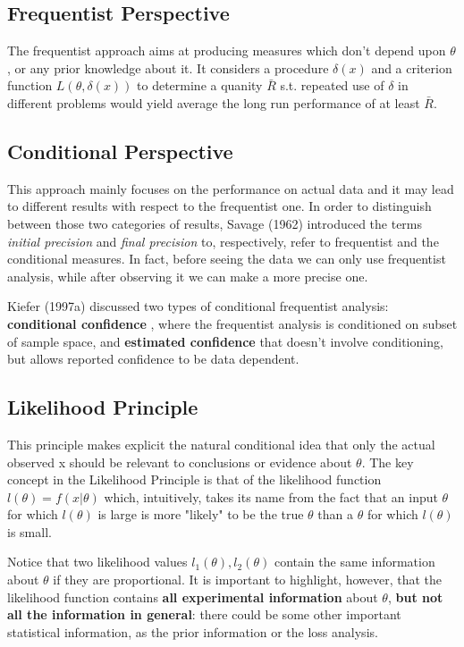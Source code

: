 \documentclass{article}
\begin{document}
	\subsection{Frequentist Perspective}
	The frequentist approach aims at producing measures which don't depend upon $\theta$, or any prior knowledge about it. It considers a procedure $\delta(x)$ and a criterion function $L(\theta, \delta(x))$ to determine a quanity $\bar{R}$ s.t. repeated use of $\delta$ in different problems would yield average the long run performance of at least $\bar{R}$.

	
	\subsection{Conditional Perspective}
	This approach mainly focuses on the performance on actual data and it may lead to different results with respect to the frequentist one. In order to distinguish between
	those two categories of results, Savage (1962) introduced the terms \textit{initial precision} and \textit{final precision} to, respectively, refer to frequentist and the conditional measures. In fact, before seeing the data we can only use frequentist analysis, while after observing it we can make a more precise one.
	
	Kiefer (1997a) discussed two types of conditional frequentist analysis: \textbf{conditional confidence} , where the frequentist analysis is conditioned on subset of sample space, and \textbf{estimated confidence} that doesn’t involve conditioning, but allows reported confidence to be data dependent.
	\subsection{Likelihood Principle}
	This principle makes explicit the natural conditional idea that only the actual
	observed x should be relevant to conclusions or evidence about $\theta$. The key concept in the Likelihood Principle is that of the likelihood function $l(\theta) = f(x | \theta)$ which, intuitively, takes its name from the fact that an input $\theta$ for which $l(\theta)$ is large is more "likely" to be the true $\theta$ than a $\theta$ for which $l(\theta)$ is small.
	

	Notice that two likelihood values $l_1(\theta), l_2(\theta)$ contain the same information about $\theta$ if they are proportional. It is important to highlight, however, that the likelihood function contains \textbf{all experimental information} about $\theta$,\textbf{ but not all the information in general}: there could be some other important statistical information, as the
	prior information or the loss analysis.
	
\end{document}
